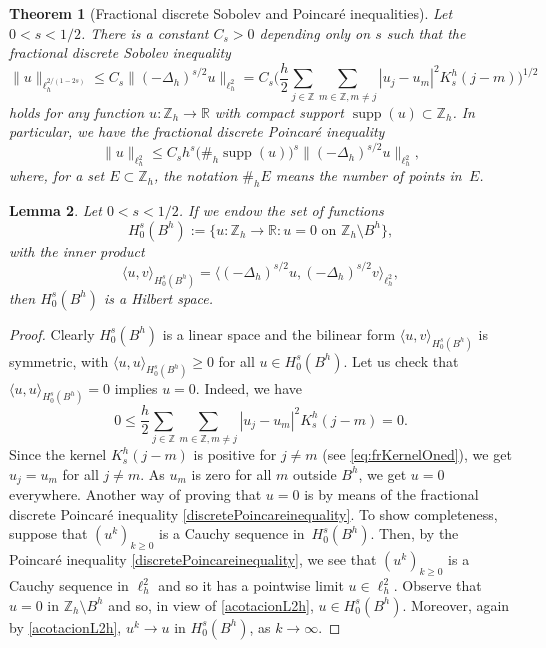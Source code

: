 \documentclass[a4paper,11pt,reqno]{amsart}
\newcommand{\R}{\mathbb{R}}
\newcommand{\Z}{\mathbb{Z}}
\newcommand{\supp}{\operatorname{supp}}
\newtheorem{thm}{Theorem}[section]
\newtheorem{lem}[thm]{Lemma}
\theoremstyle{definition}
\numberwithin{equation}{section}
\begin{document}
\begin{thm}[Fractional discrete Sobolev and Poincar\'e inequalities]
\label{thm:SobolevandPoincare}
Let $0<s<1/2$.
There is a constant $C_s>0$ depending only on $s$ such that the fractional discrete Sobolev inequality
$$
\|u\|_{\ell^{2/(1-2s)}_h}\leq C_s\|(-\Delta_h)^{s/2}u\|_{\ell^2_h} =
C_s\bigg(\frac{h}{2}\sum_{j\in\Z}\sum_{m\in\Z,m\neq j}|u_j-u_m|^2K^h_s(j-m)\bigg)^{1/2}
$$
holds for any function $u:\Z_h\to\R$ with compact support $\supp(u)\subset\Z_h$. In particular,
we have the fractional discrete Poincar\'e inequality
\begin{equation}
\label{discretePoincareinequality}
\|u\|_{\ell^2_h}\leq C_sh^s\big(\#_h\supp(u)\big)^s\|(-\Delta_h)^{s/2}u\|_{\ell^2_h},
\end{equation}
where, for a set $E\subset\Z_h$, the notation $\#_hE$ means
the number of points in~$E$.
\end{thm}

\begin{lem}
Let $0<s<1/2$. If we endow the set of functions
$$
H_0^s(B^h):=\big\{u:\Z_h\to\R:u=0 \text{ on } \Z_h\setminus B^h\big\},
$$
with the inner product
$$
\langle u,v\rangle_{H_0^s(B^h)} = \langle(-\Delta_h)^{s/2}u,(-\Delta_h)^{s/2}v\rangle_{\ell^2_h},
$$
then $H_0^s(B^h)$ is a Hilbert space.
\end{lem}

\begin{proof}
Clearly $H_0^s(B^h)$ is a linear space and the bilinear form $\langle u,v\rangle_{H_0^s(B^h)}$ is symmetric,
with $\langle u,u\rangle_{H^s_0(B^h)}\geq0$ for all $u\in H_0^s(B^h)$.
Let us check that $\langle u,u\rangle_{H^s_0(B^h)}=0$ implies $u=0$. Indeed, we have
\[
0\leq\frac{h}{2}\sum_{j\in\Z}\sum_{m\in\Z,m\neq j}|u_j-u_m|^2K^h_s(j-m)=0.
\]
Since the kernel $K_s^h(j-m)$ is positive for $j\neq m$ (see \eqref{eq:frKernelOned}),
we get $u_j=u_m$ for all $j\neq m$.
As $u_m$ is zero for all $m$ outside $B^h$, we get $u=0$ everywhere.
Another way of proving that $u=0$ is by means of the fractional discrete Poincar\'e inequality
\eqref{discretePoincareinequality}.
To show completeness, suppose that $(u^k)_{k\ge0}$ is a Cauchy
sequence in~$H_0^s(B^h)$. Then, by the Poincar\'e inequality \eqref{discretePoincareinequality},
we see that $(u^k)_{k\ge0}$ is a Cauchy sequence in $\ell^2_h$
and so it has a pointwise limit $u\in\ell^2_h$. Observe that $u=0$ in $\Z_h\setminus B^h$
and so, in view of \eqref{acotacionL2h}, $u\in H_0^s(B^h)$. Moreover,
again by \eqref{acotacionL2h}, $u^k\to u$ in $H^s_0(B^h)$, as $k\to\infty$.
\end{proof}
\end{document}
